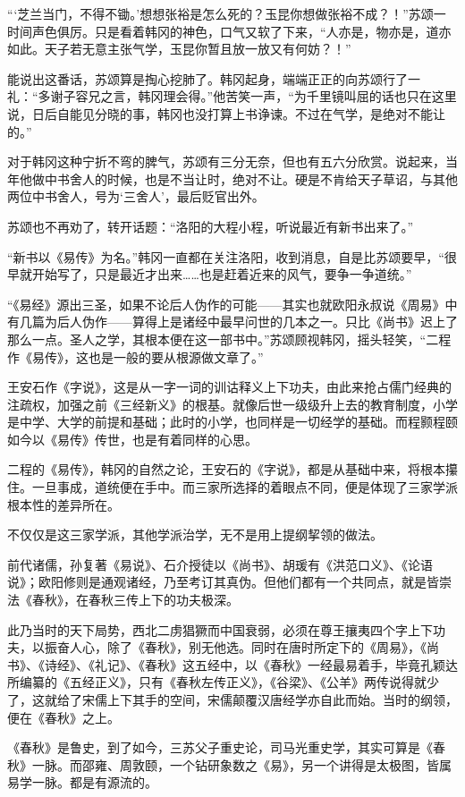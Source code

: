 “‘芝兰当门，不得不锄。’想想张裕是怎么死的？玉昆你想做张裕不成？！”苏颂一时间声色俱厉。只是看着韩冈的神色，口气又软了下来，“人亦是，物亦是，道亦如此。天子若无意主张气学，玉昆你暂且放一放又有何妨？！” 

能说出这番话，苏颂算是掏心挖肺了。韩冈起身，端端正正的向苏颂行了一礼：“多谢子容兄之言，韩冈理会得。”他苦笑一声，“为千里镜叫屈的话也只在这里说，日后自能见分晓的事，韩冈也没打算上书诤谏。不过在气学，是绝对不能让的。” 

对于韩冈这种宁折不弯的脾气，苏颂有三分无奈，但也有五六分欣赏。说起来，当年他做中书舍人的时候，也是不当让时，绝对不让。硬是不肯给天子草诏，与其他两位中书舍人，号为‘三舍人’，最后贬官出外。 

苏颂也不再劝了，转开话题：“洛阳的大程小程，听说最近有新书出来了。” 

“新书以《易传》为名。”韩冈一直都在关注洛阳，收到消息，自是比苏颂要早，“很早就开始写了，只是最近才出来……也是赶着近来的风气，要争一争道统。” 

 “《易经》源出三圣，如果不论后人伪作的可能——其实也就欧阳永叔说《周易》中有几篇为后人伪作——算得上是诸经中最早问世的几本之一。只比《尚书》迟上了那么一点。圣人之学，其根本便在这一部书中。”苏颂顾视韩冈，摇头轻笑，“二程作《易传》，这也是一般的要从根源做文章了。” 

王安石作《字说》，这是从一字一词的训诂释义上下功夫，由此来抢占儒门经典的注疏权，加强之前《三经新义》的根基。就像后世一级级升上去的教育制度，小学是中学、大学的前提和基础；此时的小学，也同样是一切经学的基础。而程颢程颐如今以《易传》传世，也是有着同样的心思。 

二程的《易传》，韩冈的自然之论，王安石的《字说》，都是从基础中来，将根本攥住。一旦事成，道统便在手中。而三家所选择的着眼点不同，便是体现了三家学派根本性的差异所在。 

不仅仅是这三家学派，其他学派治学，无不是用上提纲挈领的做法。 

前代诸儒，孙复著《易说》、石介授徒以《尚书》、胡瑗有《洪范口义》、《论语说》；欧阳修则是通观诸经，乃至考订其真伪。但他们都有一个共同点，就是皆崇法《春秋》，在春秋三传上下的功夫极深。 

此乃当时的天下局势，西北二虏猖獗而中国衰弱，必须在尊王攘夷四个字上下功夫，以振奋人心，除了《春秋》，别无他选。同时在唐时所定下的《周易》，《尚书》、《诗经》、《礼记》、《春秋》这五经中，以《春秋》一经最易着手，毕竟孔颖达所编纂的《五经正义》，只有《春秋左传正义》，《谷梁》、《公羊》两传说得就少了，这就给了宋儒上下其手的空间，宋儒颠覆汉唐经学亦自此而始。当时的纲领，便在《春秋》之上。 

《春秋》是鲁史，到了如今，三苏父子重史论，司马光重史学，其实可算是《春秋》一脉。而邵雍、周敦颐，一个钻研象数之《易》，另一个讲得是太极图，皆属易学一脉。都是有源流的。 

